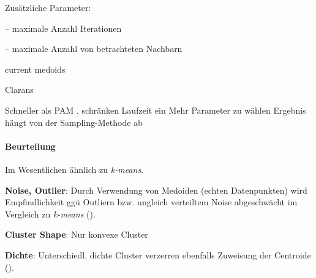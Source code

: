 \documentclass[10pt]{article} %
\begin{document}
Zusätzliche Parameter:
\begin{cptitemize} 
     \item {} -- maximale Anzahl Iterationen 
     \item {} -- maximale Anzahl von betrachteten Nachbarn  
\end{cptitemize} 

\begingroup
\removelatexerror
\begin{algorithm}[H]
\Return current medoids
\caption{Clarans}
\end{algorithm}
\endgroup

\begin{cptitemize} 
     \advantageit Schneller als PAM
     \advantageit {},  schränken Laufzeit ein
     \disadvantageit Mehr Parameter zu wählen
     \disadvantageit Ergebnis hängt von der Sampling-Methode ab 
\end{cptitemize} 

\paragraph{Beurteilung}  Im Wesentlichen
ähnlich zu \textit{k-means}.
\begin{cptitemize} 
  	 \item \textbf{Noise, Outlier}: Durch Verwendung von Medoiden
  	 	(echten Datenpunkten) wird Empfindlichkeit ggü Outliern bzw.
  	 	ungleich verteiltem Noise abgeschwächt im Vergleich zu 
  	 	\textit{k-means} ().
  	 \item \textbf{Cluster Shape}: Nur konvexe Cluster
  	 \item \textbf{Dichte}: Unterschiedl. dichte Cluster verzerren
  	 ebenfalls Zuweisung der Centroide ().
 \end{cptitemize}  
\end{document}
